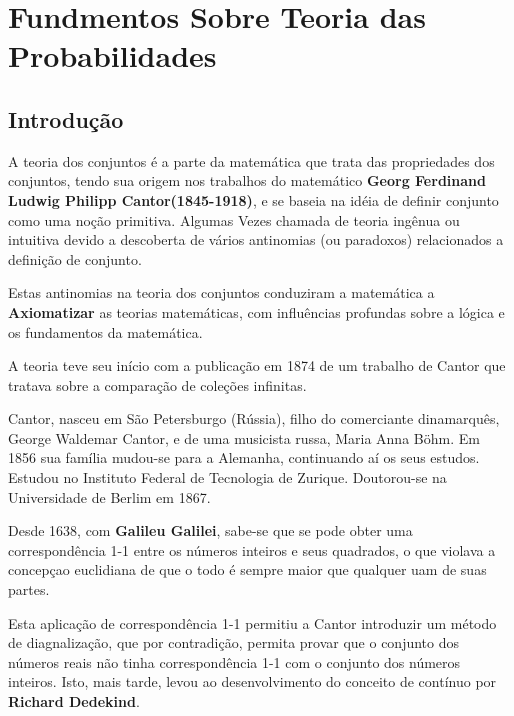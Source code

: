 \chapter{Fundmentos Sobre Teoria das Probabilidades}
\section{Introdução}

\inic A teoria dos conjuntos é a parte da matemática que trata das propriedades dos conjuntos, tendo sua origem nos trabalhos do matemático \textbf{Georg Ferdinand Ludwig Philipp Cantor(1845-1918)}, e se baseia na idéia de definir conjunto como uma noção primitiva. Algumas Vezes chamada de teoria ingênua ou intuitiva devido a descoberta de vários antinomias (ou paradoxos) relacionados a definição de conjunto.\vskip0.3cm

\inic Estas antinomias na teoria dos conjuntos conduziram a matemática a \textbf{Axiomatizar} as teorias  matemáticas, com influências profundas sobre a lógica e os fundamentos da matemática.\vskip0.3cm






\inic A teoria teve seu início com a publicação em 1874 de um trabalho de Cantor que tratava sobre a comparação de coleções infinitas.\vskip0.3cm

\inic Cantor, nasceu em São Petersburgo (Rússia), filho do comerciante dinamarquês, George Waldemar Cantor, e de uma musicista russa, Maria Anna Böhm. Em 1856 sua família mudou-se para a Alemanha, continuando aí os seus estudos. Estudou no Instituto Federal de Tecnologia de Zurique. Doutorou-se na Universidade de Berlim em 1867.\vskip0.3cm

\inic Desde 1638, com \textbf{Galileu Galilei}, sabe-se que se pode obter uma correspondência 1-1 entre os números inteiros e seus quadrados, o que violava a concepçao euclidiana de que o todo é sempre maior que qualquer uam de suas partes.\vskip0.3cm

\inic Esta aplicação de correspondência 1-1 permitiu a Cantor introduzir um método de diagnalização, que por contradição, permita provar que o conjunto dos números reais não tinha correspondência 1-1 com o conjunto dos números inteiros. Isto, mais tarde, levou ao desenvolvimento do conceito de contínuo por \textbf{Richard Dedekind}. \vskip0.3cm

